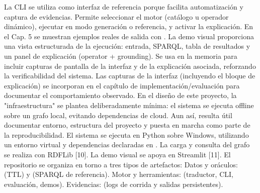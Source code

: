 {}La CLI se utiliza como interfaz de referencia porque facilita automatización y captura de evidencias. Permite seleccionar el motor (catálogo u operador dinámico), ejecutar en modo generación o referencia, y activar la explicación. En el Cap. 5 se muestran ejemplos reales de salida con .\markdownRendererInterblockSeparator
{}\markdownRendererInterblockSeparator
{}La demo visual proporciona una vista estructurada de la ejecución: entrada, SPARQL, tabla de resultados y un panel de explicación (operator + grounding). Se usa en la memoria para incluir capturas de pantalla de la interfaz y de la explicación asociada, reforzando la verificabilidad del sistema.\markdownRendererInterblockSeparator
{}\markdownRendererInterblockSeparator
{}Las capturas de la interfaz (incluyendo el bloque de explicación) se incorporan en el capítulo de implementación/evaluación para documentar el comportamiento observado.\markdownRendererInterblockSeparator
{}\markdownRendererHorizontalRule{}\markdownRendererInterblockSeparator
{}\markdownRendererInterblockSeparator
{}En el diseño de este proyecto, la "infraestructura" se plantea deliberadamente mínima: el sistema se ejecuta offline sobre un grafo local, evitando dependencias de cloud. Aun así, resulta útil documentar entorno, estructura del proyecto y puesta en marcha como parte de la reproducibilidad.\markdownRendererInterblockSeparator
{}\markdownRendererInterblockSeparator
{}El sistema se ejecuta en Python sobre Windows, utilizando un entorno virtual y dependencias declaradas en . La carga y consulta del grafo se realiza con RDFLib [10]. La demo visual se apoya en Streamlit [11].\markdownRendererInterblockSeparator
{}\markdownRendererInterblockSeparator
{}El repositorio se organiza en torno a tres tipos de artefactos:\markdownRendererInterblockSeparator
{}\markdownRendererUlBeginTight
\markdownRendererUlItem Datos y oráculos:  (TTL) y  (SPARQL de referencia).\markdownRendererUlItemEnd 
\markdownRendererUlItem Motor y herramientas:  (traductor, CLI, evaluación, demos).\markdownRendererUlItemEnd 
\markdownRendererUlItem Evidencias:  (logs de corrida y salidas persistentes).\markdownRendererUlItemEnd 
